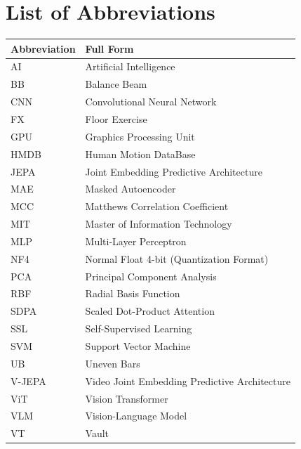 \chapter*{List of Abbreviations}

\begin{longtable}{@{}p{3.5cm}p{10cm}@{}}
\toprule
\textbf{Abbreviation} & \textbf{Full Form} \\
\midrule
\endhead
AI & Artificial Intelligence \\
BB & Balance Beam \\
CNN & Convolutional Neural Network \\
FX & Floor Exercise \\
GPU & Graphics Processing Unit \\
HMDB & Human Motion DataBase \\
JEPA & Joint Embedding Predictive Architecture \\
MAE & Masked Autoencoder \\
MCC & Matthews Correlation Coefficient \\
MIT & Master of Information Technology \\
MLP & Multi-Layer Perceptron \\
NF4 & Normal Float 4-bit (Quantization Format) \\
PCA & Principal Component Analysis \\
RBF & Radial Basis Function \\
SDPA & Scaled Dot-Product Attention \\
SSL & Self-Supervised Learning \\
SVM & Support Vector Machine \\
UB & Uneven Bars \\
V-JEPA & Video Joint Embedding Predictive Architecture \\
ViT & Vision Transformer \\
VLM & Vision-Language Model \\
VT & Vault \\
\bottomrule
\end{longtable}
